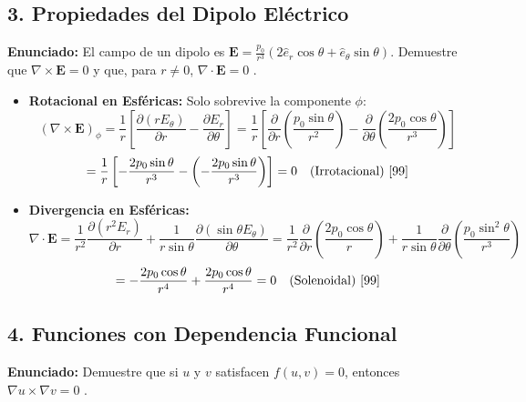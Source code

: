 \documentclass[a4paper]{article}
\begin{document}
\subsection*{3. Propiedades del Dipolo Eléctrico}
\textbf{Enunciado:} El campo de un dipolo es $\mathbf{E} = \frac{p_0}{r^3}(2\hat{e}_r \cos \theta + \hat{e}_\theta \sin \theta)$. Demuestre que $\nabla \times \mathbf{E} = 0$ y que, para $r \neq 0$, $\nabla \cdot \mathbf{E} = 0$ \cite{99}.

\begin{itemize}
    \item \textbf{Rotacional en Esféricas:} Solo sobrevive la componente $\phi$:
    \begin{equation*}
        (\nabla \times \mathbf{E})_\phi = \frac{1}{r} \left[ \frac{\partial (r E_\theta)}{\partial r} - \frac{\partial E_r}{\partial \theta} \right] = \frac{1}{r} \left[ \frac{\partial}{\partial r} \left( \frac{p_0 \sin \theta}{r^2} \right) - \frac{\partial}{\partial \theta} \left( \frac{2 p_0 \cos \theta}{r^3} \right) \right]
    \end{equation*}
    \begin{equation*}
        = \frac{1}{r} \left[ -\frac{2 p_0 \sin \theta}{r^3} - \left( -\frac{2 p_0 \sin \theta}{r^3} \right) \right] = 0 \quad \text{(Irrotacional) \cite{99}}
    \end{equation*}
    \item \textbf{Divergencia en Esféricas:}
    \begin{equation*}
        \nabla \cdot \mathbf{E} = \frac{1}{r^2} \frac{\partial (r^2 E_r)}{\partial r} + \frac{1}{r \sin \theta} \frac{\partial (\sin \theta E_\theta)}{\partial \theta} = \frac{1}{r^2} \frac{\partial}{\partial r} \left( \frac{2 p_0 \cos \theta}{r} \right) + \frac{1}{r \sin \theta} \frac{\partial}{\partial \theta} \left( \frac{p_0 \sin^2 \theta}{r^3} \right)
    \end{equation*}
    \begin{equation*}
        = -\frac{2 p_0 \cos \theta}{r^4} + \frac{2 p_0 \cos \theta}{r^4} = 0 \quad \text{(Solenoidal) \cite{99}}
    \end{equation*}
\end{itemize}

\subsection*{4. Funciones con Dependencia Funcional}
\textbf{Enunciado:} Demuestre que si $u$ y $v$ satisfacen $f(u, v) = 0$, entonces $\nabla u \times \nabla v = 0$ \cite{99}.
\end{document}
